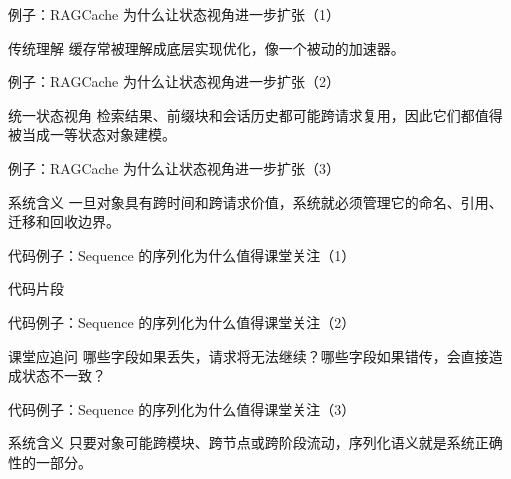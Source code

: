 \begin{frame}{例子：RAGCache 为什么让状态视角进一步扩张（1）}
\begin{block}{传统理解}
    缓存常被理解成底层实现优化，像一个被动的加速器。
  \end{block}
\end{frame}

\begin{frame}{例子：RAGCache 为什么让状态视角进一步扩张（2）}
\begin{block}{统一状态视角}
    检索结果、前缀块和会话历史都可能跨请求复用，因此它们都值得被当成一等状态对象建模。
  \end{block}
\end{frame}

\begin{frame}{例子：RAGCache 为什么让状态视角进一步扩张（3）}
\begin{block}{系统含义}
    一旦对象具有跨时间和跨请求价值，系统就必须管理它的命名、引用、迁移和回收边界。
  \end{block}
\end{frame}

\begin{frame}{代码例子：Sequence 的序列化为什么值得课堂关注（1）}
\begin{block}{代码片段}
    {\ttfamily\small
    \par
    \par
    }
  \end{block}
\end{frame}

\begin{frame}{代码例子：Sequence 的序列化为什么值得课堂关注（2）}
\begin{block}{课堂应追问}
    哪些字段如果丢失，请求将无法继续？哪些字段如果错传，会直接造成状态不一致？
  \end{block}
\end{frame}

\begin{frame}{代码例子：Sequence 的序列化为什么值得课堂关注（3）}
\begin{block}{系统含义}
    只要对象可能跨模块、跨节点或跨阶段流动，序列化语义就是系统正确性的一部分。
  \end{block}
\end{frame}

